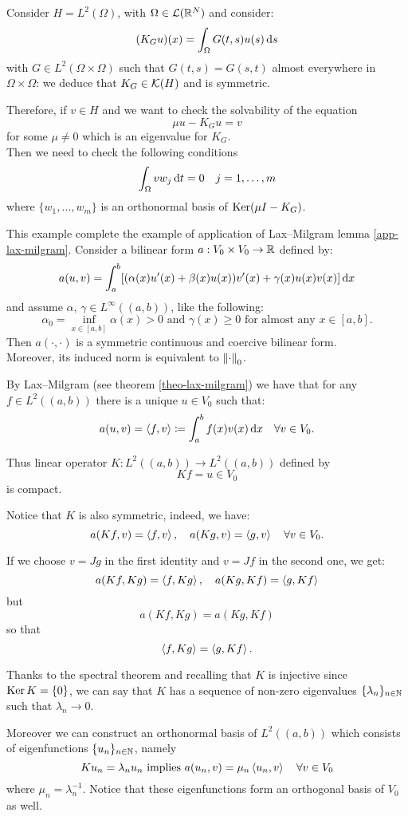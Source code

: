 \begin{exam}
	Consider $H= L^2(\Omega)$, with $\Omega \in \mathcal L(\mathbb R^N)$ and consider:
	$$
	(K_G u)(x) 
	= \int_\Omega G(t,s) u(s) \, \mathrm d s
	$$
	with $G \in L^2(\Omega \times \Omega)$ such that $G(t,s)=G(s,t)$ almost everywhere in $\Omega \times \Omega$: we deduce that $K_G \in \mathcal K(H)$ and is symmetric.
	
	Therefore, if $v \in H$ and we want to check the solvability of the equation
	$$
	\mu u - K_G u
	= v
	$$
	for some $\mu \neq 0$ which is an eigenvalue for $K_G$.\\
	Then we need to check the following conditions
	$$
	\int_\Omega v w_j \, \mathrm d t 
	= 0 
	\quad 
	j = 1, \ldots, m
	$$
	where $\{w_1, \ldots , w_m\}$ is an orthonormal basis of $\operatorname{Ker} (\mu I - K_G)$.	
\end{exam}


\begin{exam} This example complete the example of application of Lax--Milgram lemma \vref{app-lax-milgram}.
	Consider a bilinear form $a: V_0 \times V_0 \to \mathbb R$ defined by:
	$$
	a(u,v)
	= \int_a^b [(\alpha(x)u'(x) 
	+ \beta(x)u(x))v'(x) 
	+ \gamma(x)u(x)v(x)]\,\mathrm d x
	$$
	and assume  $\alpha, \, \gamma \in L^\infty((a,b))$, like the following:
	$$
	\alpha_0
	= \inf\limits_{x\in[a,b]} \alpha(x)
	> 0
	\text{ and }
	\gamma(x) 
	\geq 0
	\text{ for almost any }
	x \in [a,b]
	.
	$$
	Then $a(\cdot, \cdot)$ is a symmetric continuous and coercive bilinear form.\\
	Moreover, its induced norm is equivalent to $\left\lVert\cdot\right\rVert_0$.
	
	By Lax--Milgram (see theorem \vref{theo-lax-milgram}) we have that for any $f \in L^2((a,b))$
	there is a unique $u \in V_0$ such that:
	$$
	a(u,v) 
	= \left\langle f,v\right\rangle 
	\coloneqq \int_a^b f(x) v(x) \, \mathrm d x 
	\quad \forall v \in V_0
	.
	$$
	
	Thus linear operator $K: L^2((a,b)) \to L^2((a,b))$ defined by 
	$$
	Kf
	= u \in V_0
	$$
	is compact.
	
	Notice that $K$ is also symmetric, indeed, we have:
	$$
	a(Kf,v)
	=
	\left\langle f, v\right\rangle,
	\quad
	a(Kg, v)
	= \left\langle g, v\right\rangle
	\quad
	\forall v \in V_0
	.
	$$
	
	If we choose $v = Jg$ in the first identity and $v = J f$ in the second one, we get:
	$$
	a(Kf, Kg) 
	= \left\langle f, Kg\right\rangle
	,
	\quad
	a(Kg, Kf)
	= \left\langle g , Kf\right\rangle
	$$
	but 
	$$
	a(Kf, Kg) 
	= a(Kg, Kf)
	$$
	so that
	$$
	\left\langle f, Kg\right\rangle 
	= \left\langle g, Kf\right\rangle
	.
	$$
	
	Thanks to the spectral theorem and recalling that $K$ is injective since $\operatorname{Ker} K = \{0\}$, we can say that $K$ has a sequence of non-zero eigenvalues $\{\lambda_n\}_{n\in \mathbb N}$ such that $\lambda_n \to 0$.
	
	Moreover we can construct an orthonormal basis of $L^2((a,b))$ which consists of eigenfunctions $\{u_n\}_{n\in \mathbb N}$, namely
	$$
	Ku_n 
	= \lambda_n u_n
	\text{ implies }
	a(u_n, v)
	= \mu_n \left\langle u_n, v\right\rangle
	\quad 
	\forall v \in V_0
	$$
	where $\mu_n = \lambda_n^{-1}$.
	Notice that these eigenfunctions form an orthogonal basis of $V_0$ as well.	
\end{exam}

